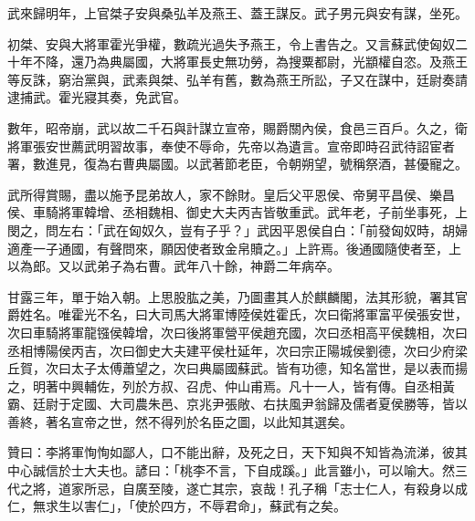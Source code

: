 \begin{pinyinscope}
武來歸明年，上官桀子安與桑弘羊及燕王、蓋王謀反。武子男元與安有謀，坐死。

初桀、安與大將軍霍光爭權，數疏光過失予燕王，令上書告之。又言蘇武使匈奴二十年不降，還乃為典屬國，大將軍長史無功勞，為搜粟都尉，光顓權自恣。及燕王等反誅，窮治黨與，武素與桀、弘羊有舊，數為燕王所訟，子又在謀中，廷尉奏請逮捕武。霍光寢其奏，免武官。

數年，昭帝崩，武以故二千石與計謀立宣帝，賜爵關內侯，食邑三百戶。久之，衛將軍張安世薦武明習故事，奉使不辱命，先帝以為遺言。宣帝即時召武待詔宦者署，數進見，復為右曹典屬國。以武著節老臣，令朝朔望，號稱祭酒，甚優寵之。

武所得賞賜，盡以施予昆弟故人，家不餘財。皇后父平恩侯、帝舅平昌侯、樂昌侯、車騎將軍韓增、丞相魏相、御史大夫丙吉皆敬重武。武年老，子前坐事死，上閔之，問左右：「武在匈奴久，豈有子乎？」武因平恩侯自白：「前發匈奴時，胡婦適產一子通國，有聲問來，願因使者致金帛贖之。」上許焉。後通國隨使者至，上以為郎。又以武弟子為右曹。武年八十餘，神爵二年病卒。

甘露三年，單于始入朝。上思股肱之美，乃圖畫其人於麒麟閣，法其形貌，署其官爵姓名。唯霍光不名，曰大司馬大將軍博陸侯姓霍氏，次曰衛將軍富平侯張安世，次曰車騎將軍龍镪侯韓增，次曰後將軍營平侯趙充國，次曰丞相高平侯魏相，次曰丞相博陽侯丙吉，次曰御史大夫建平侯杜延年，次曰宗正陽城侯劉德，次曰少府梁丘賀，次曰太子太傅蕭望之，次曰典屬國蘇武。皆有功德，知名當世，是以表而揚之，明著中興輔佐，列於方叔、召虎、仲山甫焉。凡十一人，皆有傳。自丞相黃霸、廷尉于定國、大司農朱邑、京兆尹張敞、右扶風尹翁歸及儒者夏侯勝等，皆以善終，著名宣帝之世，然不得列於名臣之圖，以此知其選矣。

贊曰：李將軍恂恂如鄙人，口不能出辭，及死之日，天下知與不知皆為流涕，彼其中心誠信於士大夫也。諺曰：「桃李不言，下自成蹊。」此言雖小，可以喻大。然三代之將，道家所忌，自廣至陵，遂亡其宗，哀哉！孔子稱「志士仁人，有殺身以成仁，無求生以害仁」，「使於四方，不辱君命」，蘇武有之矣。


\end{pinyinscope}